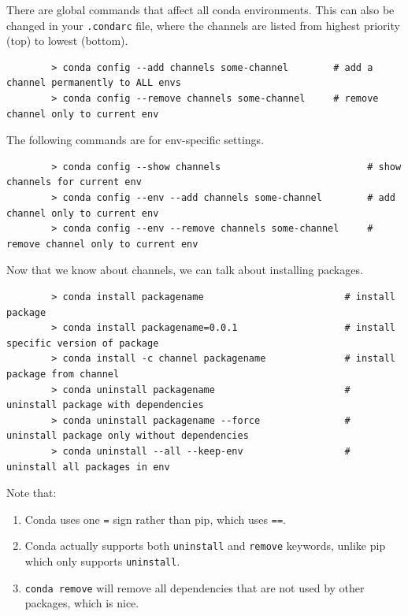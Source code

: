 \documentclass{article}
\begin{document}
    \begin{example}
      There are global commands that affect all conda environments. This can also be changed in your \texttt{.condarc} file, where the channels are listed from highest priority (top) to lowest (bottom). 
      \begin{lstlisting}
        > conda config --add channels some-channel        # add a channel permanently to ALL envs 
        > conda config --remove channels some-channel     # remove channel only to current env 
      \end{lstlisting}

      The following commands are for env-specific settings. 
      \begin{lstlisting}
        > conda config --show channels                          # show channels for current env
        > conda config --env --add channels some-channel        # add channel only to current env 
        > conda config --env --remove channels some-channel     # remove channel only to current env 
      \end{lstlisting}
    \end{example} 
    
    \begin{example}
      Now that we know about channels, we can talk about installing packages. 
      \begin{lstlisting}
        > conda install packagename                         # install package 
        > conda install packagename=0.0.1                   # install specific version of package
        > conda install -c channel packagename              # install package from channel
        > conda uninstall packagename                       # uninstall package with dependencies
        > conda uninstall packagename --force               # uninstall package only without dependencies
        > conda uninstall --all --keep-env                  # uninstall all packages in env
      \end{lstlisting}
      Note that: 
      \begin{enumerate}
        \item Conda uses one \texttt{=} sign rather than pip, which uses \texttt{==}. 
        \item Conda actually supports both \texttt{uninstall} and \texttt{remove} keywords, unlike pip which only supports \texttt{uninstall}. 
        \item \texttt{conda remove} will remove all dependencies that are not used by other packages, which is nice. 
      \end{enumerate}
    \end{example}
\end{document}
